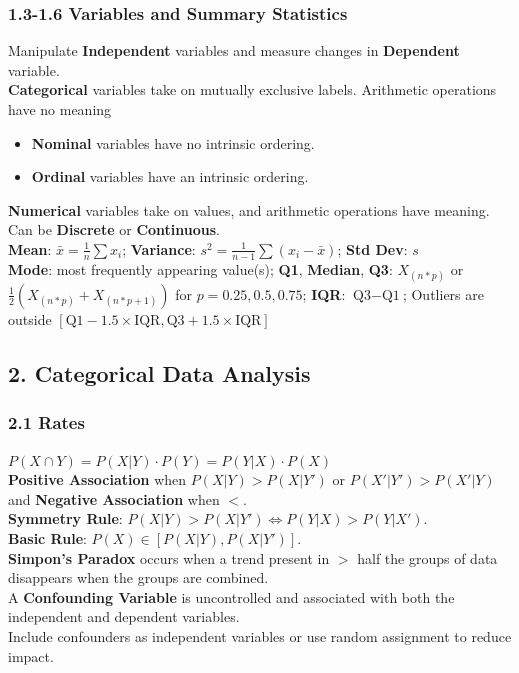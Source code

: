 \begin{multicols*}{3}
\subsubsection{1.3-1.6 Variables and Summary Statistics}
Manipulate \textbf{Independent} variables and measure changes in \textbf{Dependent} variable.\\
\textbf{Categorical} variables take on mutually exclusive labels. Arithmetic operations have no meaning
\begin{itemize}
    \item \textbf{Nominal} variables have no intrinsic ordering.
    \item \textbf{Ordinal} variables have an intrinsic ordering.
\end{itemize}
\textbf{Numerical} variables take on values, and arithmetic operations have meaning. Can be \textbf{Discrete} or \textbf{Continuous}.\\
\textbf{Mean}: $\bar{x}=\frac{1}{n}\sum x_i$; \textbf{Variance}: $s^2=\frac{1}{n-1}\sum(x_i-\bar{x})$; \textbf{Std Dev}: $s$\\
\textbf{Mode}: most frequently appearing value(s); \textbf{Q1}, \textbf{Median}, \textbf{Q3}: $X_{(n*p)}$ or $\frac{1}{2}(X_{(n*p)} + X_{(n*p + 1)})$ for $p=0.25, 0.5, 0.75$; \textbf{IQR}: $\text{Q3}-\text{Q1}$; Outliers are outside $[\text{Q1}- 1.5 \times \text{IQR}, \text{Q3}+ 1.5 \times \text{IQR}]$\\

\subsection{2. Categorical Data Analysis}
\subsubsection{2.1 Rates}
$P(X\cap Y) = P(X|Y)\cdot P(Y)=P(Y|X)\cdot P(X)$\\
\textbf{Positive Association} when $P(X|Y)> P(X|Y')$ or $P(X'|Y')> P(X'|Y)$ and \textbf{Negative Association} when $<$.\\
\textbf{Symmetry Rule}:  $P(X|Y)> P(X|Y') \Leftrightarrow P(Y|X)> P(Y|X')$.\\
\textbf{Basic Rule}: $P(X)\in [P(X|Y), P(X|Y')]$.\\
\textbf{Simpon's Paradox} occurs when a trend present in $\gt$ half the groups of data disappears when the groups are combined.\\
A \textbf{Confounding Variable} is uncontrolled and associated with both the independent and dependent variables.\\
Include confounders as independent variables or use random assignment to reduce impact.


\end{multicols*}
